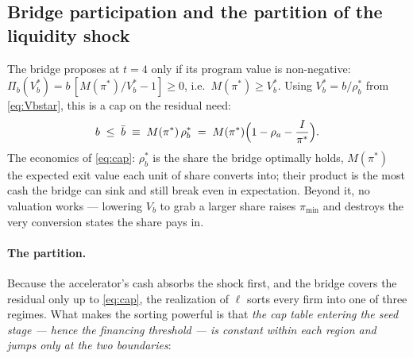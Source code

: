 \documentclass[11pt]{article}
\theoremstyle{definition}
\newcommand{\pimin}{\pi_{\min}}
\begin{document}
\subsection{Bridge participation and the partition of the liquidity shock}\label{sec:partition}

The bridge proposes at $t=4$ only if its program value is non-negative: $\Pi_b(V_b^{*}) = b\,[M(\pi^{*})/V_b^{*}-1] \ge 0$, i.e.\ $M(\pi^{*}) \ge V_b^{*}$. Using $V_b^{*}=b/\rho_b^{*}$ from \eqref{eq:Vbstar}, this is a cap on the residual need:
\begin{equation}
b \;\le\; \bar b \;\equiv\; M(\pi^{*})\,\rho_b^{*}
\;=\; M(\pi^{*})\Bigl(1-\rho_a-\frac{I}{\pi^{*}}\Bigr).
\label{eq:cap}
\end{equation}
The economics of \eqref{eq:cap}: $\rho_b^{*}$ is the share the bridge optimally holds, $M(\pi^{*})$ the expected exit value each unit of share converts into; their product is the most cash the bridge can sink and still break even in expectation. Beyond it, no valuation works --- lowering $V_b$ to grab a larger share raises $\pimin$ and destroys the very conversion states the share pays in.

\paragraph{The partition.} Because the accelerator's cash absorbs the shock first, and the bridge covers the residual only up to \eqref{eq:cap}, the realization of $\ell$ sorts every firm into one of three regimes. What makes the sorting powerful is that \emph{the cap table entering the seed stage --- hence the financing threshold --- is constant within each region and jumps only at the two boundaries}:
\end{document}
